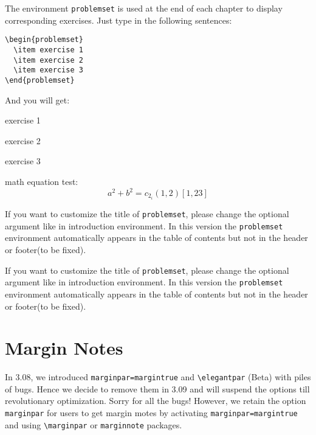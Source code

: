 \documentclass[11pt,fancy,twocol,twoside]{elegantbook}
\begin{document}
The environment \lstinline{problemset} is used at the end of each chapter to display corresponding exercises. Just type in the following sentences:
\begin{lstlisting}
\begin{problemset}
  \item exercise 1
  \item exercise 2
  \item exercise 3
\end{problemset}
\end{lstlisting}
And you will get:
\begin{problemset}
  \item exercise 1
  \item exercise 2
  \item exercise 3
  \item math equation test:
  \begin{equation}
  a^2+b^2=c_{2_{i}} (1,2) [1,23]
  \end{equation}
\end{problemset}
\begin{remark}
If you want to customize the title of \lstinline{problemset}, please change the optional argument like in introduction environment. In this version the \lstinline{problemset} environment automatically appears in the table of contents but not in the header or footer(to be fixed).
\end{remark}

\begin{solution}
  If you want to customize the title of \lstinline{problemset}, please change the optional argument like in introduction environment. In this version the \lstinline{problemset} environment automatically appears in the table of contents but not in the header or footer(to be fixed).
\end{solution}

\section{Margin Notes}
In 3.08, we introduced \lstinline{marginpar=margintrue} and \lstinline{\elegantpar} (Beta) with piles of bugs. Hence we decide to remove them in 3.09 and will suspend the options till revolutionary optimization. Sorry for all the bugs! However, we retain the option \lstinline{marginpar} for users to get margin motes by activating \lstinline{marginpar=margintrue} and using \lstinline{\marginpar} or \lstinline{marginnote} packages.
\end{document}
